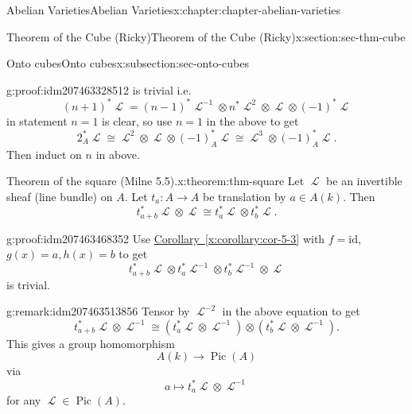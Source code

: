 \documentclass[oneside,10pt,]{book}
\numberwithin{equation}{section}
\newcommand{\sheaf}[1]{\operatorname{\mathcal{#1}}}
\newcommand{\id}{\mathrm{id}}
\DeclareMathOperator{\Pic}{Pic}
\begin{document}
\begin{chapterptx}{Abelian Varieties}{}{Abelian Varieties}{}{}{x:chapter:chapter-abelian-varieties}
\begin{sectionptx}{Theorem of the Cube (Ricky)}{}{Theorem of the Cube (Ricky)}{}{}{x:section:sec-thm-cube}
\begin{subsectionptx}{Onto cubes}{}{Onto cubes}{}{}{x:subsection:sec-onto-cubes}
\begin{proofptx}{}{g:proof:idm207463328512}
is trivial i.e.%
\begin{equation*}
(n+1)^*\sheaf L =  (n-1)^*\sheaf L^{-1}\otimes n^*\sheaf L^2 \otimes   \sheaf L \otimes   (-1)^*\sheaf L
\end{equation*}
in statement \(n = 1\) is clear, so use \(n=1\) in the above to get%
\begin{equation*}
2_A^*\sheaf L \cong \sheaf L^2 \otimes \sheaf L \otimes (-1)^*_A \sheaf L\cong \sheaf L^3 \otimes (-1)_A^*\sheaf  L\text{.}
\end{equation*}
Then induct on \(n\) in above.%
\end{proofptx}
\begin{theorem}{Theorem of the square (Milne 5.5).}{}{x:theorem:thm-square}%
Let \(\sheaf L\) be an invertible sheaf (line bundle) on \(A\). Let \(t_a \colon A\to A\) be translation by \(a\in A(k)\). Then%
\begin{equation*}
t_{a+b}^*\sheaf L \otimes \sheaf L \cong t_a^*\sheaf L \otimes t_b^* \sheaf L\text{.}
\end{equation*}
%
\end{theorem}
\begin{proofptx}{}{g:proof:idm207463468352}
Use \hyperref[x:corollary:cor-5-3]{Corollary~\ref{x:corollary:cor-5-3}} with \(f=  \id\), \(g(x)  = a, h(x) = b\) to get%
\begin{equation*}
t_{a+b}^*\sheaf L \otimes t_{a}^*\sheaf L ^{-1}\otimes t_b^* \sheaf L ^{-1} \otimes \sheaf L
\end{equation*}
is trivial.%
\end{proofptx}
\begin{remark}{}{g:remark:idm207463513856}%
Tensor by \(\sheaf L^{-2}\) in the above equation to get%
\begin{equation*}
t_{a+b}^*\sheaf L \otimes\sheaf L^{-1} \cong ( t_{a}^*\sheaf L \otimes \sheaf L^{-1}) \otimes(t_b^* \sheaf L\otimes \sheaf L^{-1})\text{.}
\end{equation*}
This gives a group homomorphism%
\begin{equation*}
A(k) \to \Pic(A)
\end{equation*}
via%
\begin{equation*}
a\mapsto t_a^*\sheaf L \otimes \sheaf L^{-1}
\end{equation*}
for any \(\sheaf L \in \Pic(A)\).%
\end{remark}
\end{subsectionptx}
\end{sectionptx}
%
%
\typeout{************************************************}

\end{chapterptx}
\end{document}
